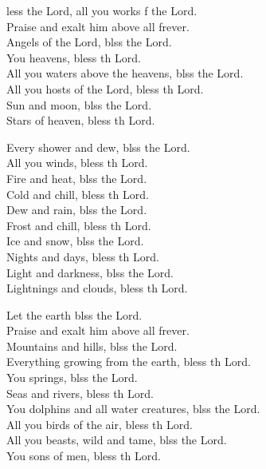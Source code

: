 \begin{psalmverse}
  \begin{patverse}
    less the Lord, all you works f the Lord.\Med\\
Praise and exalt him above all frever.\\
Angels of the Lord, blss the Lord.\Med\\
You heavens, bless th Lord.\\
All you waters above the heavens, blss the Lord.\Med\\
All you hosts of the Lord, bless th Lord.\\
Sun and moon, blss the Lord.\Med\\
Stars of heaven, bless th Lord.

Every shower and dew, blss the Lord.\Med\\
All you winds, bless th Lord.\\
Fire and heat, blss the Lord.\Med\\
Cold and chill, bless th Lord.\\
Dew and rain, blss the Lord.\Med\\
Frost and chill, bless th Lord.\\
Ice and snow, blss the Lord.\Med\\
Nights and days, bless th Lord.\\
Light and darkness, blss the Lord.\Med\\
Lightnings and clouds, bless th Lord.

Let the earth blss the Lord.\Med\\
Praise and exalt him above all frever.\\
Mountains and hills, blss the Lord.\Med\\
Everything growing from the earth, bless th Lord.\\
You springs, blss the Lord.\Med\\
Seas and rivers, bless th Lord.\\
You dolphins and all water creatures, blss the Lord.\Med\\
All you birds of the air, bless th Lord.\\
All you beasts, wild and tame, blss the Lord.\Med\\
You sons of men, bless th Lord.


\end{patverse}
\end{psalmverse}
